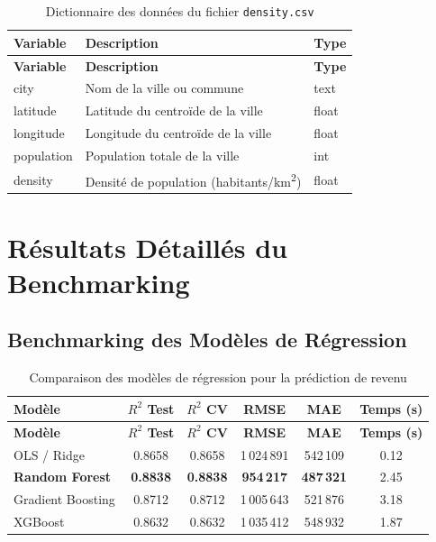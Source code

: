 \documentclass[11pt,a4paper,twoside]{report}
\begin{document}
\begin{center}
\small
\renewcommand{\arraystretch}{1.15}
\begin{longtable}{|p{4.2cm}|p{6.5cm}|p{2.3cm}|}
\caption{Dictionnaire des données du fichier \texttt{density.csv}} \label{tab:dict_density} \\
\hline
\textbf{Variable} & \textbf{Description} & \textbf{Type} \\
\hline
\endfirsthead
\hline
\textbf{Variable} & \textbf{Description} & \textbf{Type} \\
\hline
\endhead
\hline
\endfoot
\hline
\endlastfoot

city & Nom de la ville ou commune & text \\
\hline
latitude & Latitude du centroïde de la ville & float \\
\hline
longitude & Longitude du centroïde de la ville & float \\
\hline
population & Population totale de la ville & int \\
\hline
density & Densité de population (habitants/km\textsuperscript{2}) & float \\
\hline

\end{longtable}
\end{center}


\section{Résultats Détaillés du Benchmarking}

\subsection{Benchmarking des Modèles de Régression}

\begin{center}
\small
\renewcommand{\arraystretch}{1.15}
\begin{longtable}{|p{3.5cm}|c|c|c|c|c|}
\caption{Comparaison des modèles de régression pour la prédiction de revenu} \label{tab:bench_reg} \\
\hline
\textbf{Modèle} & \textbf{$R^2$ Test} & \textbf{$R^2$ CV} & \textbf{RMSE} & \textbf{MAE} & \textbf{Temps (s)} \\
\hline
\endfirsthead
\hline
\textbf{Modèle} & \textbf{$R^2$ Test} & \textbf{$R^2$ CV} & \textbf{RMSE} & \textbf{MAE} & \textbf{Temps (s)} \\
\hline
\endhead
\hline
\endfoot
\hline
\endlastfoot

OLS / Ridge & 0.8658 & 0.8658 & 1\,024\,891 & 542\,109 & 0.12 \\
\hline
\textbf{Random Forest} & \textbf{0.8838} & \textbf{0.8838} & \textbf{954\,217} & \textbf{487\,321} & 2.45 \\
\hline
Gradient Boosting & 0.8712 & 0.8712 & 1\,005\,643 & 521\,876 & 3.18 \\
\hline
XGBoost & 0.8632 & 0.8632 & 1\,035\,412 & 548\,932 & 1.87 \\
\hline

\end{longtable}
\end{center}
\end{document}
